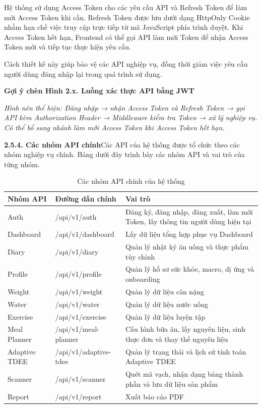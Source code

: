 Hệ thống sử dụng Access Token cho các yêu cầu API và Refresh Token để làm mới Access Token khi cần. Refresh Token được lưu dưới dạng HttpOnly Cookie nhằm hạn chế việc truy cập trực tiếp từ mã JavaScript phía trình duyệt. Khi Access Token hết hạn, Frontend có thể gọi API làm mới Token để nhận Access Token mới và tiếp tục thực hiện yêu cầu.

Cách thiết kế này giúp bảo vệ các API nghiệp vụ, đồng thời giảm việc yêu cầu người dùng đăng nhập lại trong quá trình sử dụng.

\textbf{Gợi ý chèn Hình 2.x. Luồng xác thực API bằng JWT}

\textit{Hình nên thể hiện: Đăng nhập → nhận Access Token và Refresh Token → gọi API kèm Authorization Header → Middleware kiểm tra Token → xử lý nghiệp vụ. Có thể bổ sung nhánh làm mới Access Token khi Access Token hết hạn.}

\textbf{2.5.4. Các nhóm API chính}Các API của hệ thống được tổ chức theo các nhóm nghiệp vụ chính. Bảng dưới đây trình bày các nhóm API và vai trò của từng nhóm.

\begin{table}[H]
\centering
\caption{Các nhóm API chính của hệ thống}
\begin{tabular}{|p{4cm}|p{5.5cm}|p{5.5cm}|}
\hline
\textbf{Nhóm API} & \textbf{Đường dẫn chính} & \textbf{Vai trò} \\ \hline
Auth & /api/v1/auth & Đăng ký, đăng nhập, đăng xuất, làm mới Token, lấy thông tin người dùng hiện tại \\ \hline
Dashboard & /api/v1/dashboard & Lấy dữ liệu tổng hợp phục vụ Dashboard \\ \hline
Diary & /api/v1/diary & Quản lý nhật ký ăn uống và thực phẩm tùy chỉnh \\ \hline
Profile & /api/v1/profile & Quản lý hồ sơ sức khỏe, macro, dị ứng và onboarding \\ \hline
Weight & /api/v1/weight & Quản lý dữ liệu cân nặng \\ \hline
Water & /api/v1/water & Quản lý dữ liệu nước uống \\ \hline
Exercise & /api/v1/exercise & Quản lý dữ liệu luyện tập \\ \hline
Meal Planner & /api/v1/meal-planner & Cấu hình bữa ăn, lấy nguyên liệu, sinh thực đơn và thay thế nguyên liệu \\ \hline
Adaptive TDEE & /api/v1/adaptive-tdee & Quản lý trạng thái và lịch sử tính toán Adaptive TDEE \\ \hline
Scanner & /api/v1/scanner & Quét mã vạch, nhận dạng bảng thành phần và lưu dữ liệu sản phẩm \\ \hline
Report & /api/v1/report & Xuất báo cáo PDF \\ \hline
\end{tabular}
\end{table}


